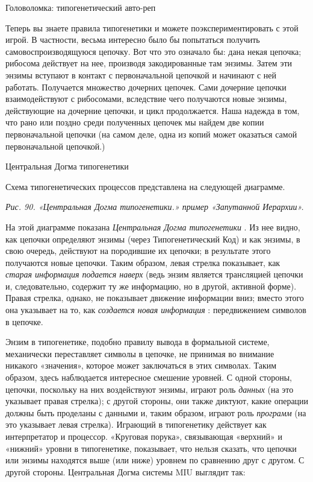 \documentclass[../main.tex]{subfiles}
\begin{document}
Головоломка: типогенетический авто-реп

Теперь вы знаете правила типогенетики и можете поэкспериментировать с этой игрой. В частности, весьма интересно было бы попытаться получить самовоспроизводящуюся цепочку. Вот что это означало бы: дана некая цепочка; рибосома действует на нее, производя закодированные там энзимы. Затем эти энзимы вступают в контакт с первоначальной цепочкой и начинают с ней работать. Получается множество дочерних цепочек. Сами дочерние цепочки взаимодействуют с рибосомами, вследствие чего получаются новые энзимы, действующие на дочерние цепочки, и цикл продолжается. Наша надежда в том, что рано или поздно среди полученных цепочек мы найдем две копии первоначальной цепочки (на самом деле, одна из копий может оказаться самой первоначальной цепочкой.)

Центральная Догма типогенетики

Схема типогенетических процессов представлена на следующей диаграмме.

\emph{Рис. 90. «Центральная Догма типогенетики.» пример «Запутанной Иерархии».}

На этой диаграмме показана \emph{Центральная Догма типогенетики} . Из нее видно, как цепочки определяют энзимы (через Типогенетический Код) и как энзимы, в свою очередь, действуют на породившие их цепочки; в результате этого получаются новые цепочки. Таким образом, левая стрелка показывает, как \emph{старая информация подается наверх} (ведь энзим является трансляцией цепочки и, следовательно, содержит ту же информацию, но в другой, активной форме). Правая стрелка, однако, не показывает движение информации вниз; вместо этого она указывает на то, как \emph{создается новая информация} : передвижением символов в цепочке.

Энзим в типогенетике, подобно правилу вывода в формальной системе, механически переставляет символы в цепочке, не принимая во внимание никакого «значения», которое может заключаться в этих символах. Таким образом, здесь наблюдается интересное смешение уровней. С одной стороны, цепочки, поскольку на них воздействуют энзимы, играют роль \emph{данных} (на это указывает правая стрелка); с другой стороны, они также диктуют, какие операции должны быть проделаны с данными и, таким образом, играют роль \emph{программ} (на это указывает левая стрелка). Играющий в типогенетику действует как интерпретатор и процессор. «Круговая порука», связывающая «верхний» и «нижний» уровни в типогенетике, показывает, что нельзя сказать, что цепочки или энзимы находятся выше (или ниже) уровнем по сравнению друг с другом. С другой стороны. Центральная Догма системы MIU выглядит так:
\end{document}
